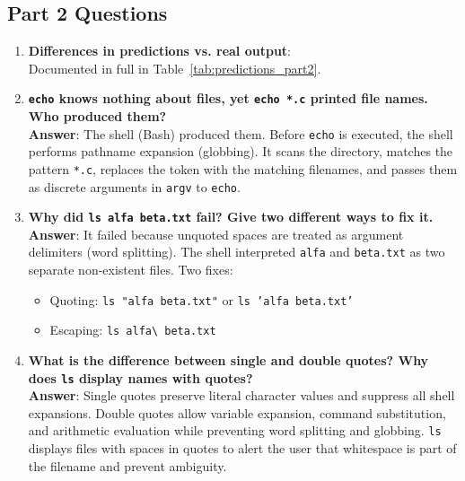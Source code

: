 \documentclass[12pt,a4paper]{article}
\begin{document}
\subsection{Part 2 Questions}
\begin{enumerate}
    \item \textbf{Differences in predictions vs. real output}: \\
    Documented in full in Table~\ref{tab:predictions_part2}.
    
    \item \textbf{\texttt{echo} knows nothing about files, yet \texttt{echo *.c} printed file names. Who produced them?} \\
    \textbf{Answer}: The shell (Bash) produced them. Before \texttt{echo} is executed, the shell performs pathname expansion (globbing). It scans the directory, matches the pattern \texttt{*.c}, replaces the token with the matching filenames, and passes them as discrete arguments in \texttt{argv} to \texttt{echo}.
    
    \item \textbf{Why did \texttt{ls alfa beta.txt} fail? Give two different ways to fix it.} \\
    \textbf{Answer}: It failed because unquoted spaces are treated as argument delimiters (word splitting). The shell interpreted \texttt{alfa} and \texttt{beta.txt} as two separate non-existent files. Two fixes:
    \begin{itemize}
        \item Quoting: \texttt{ls "alfa beta.txt"} or \texttt{ls 'alfa beta.txt'}
        \item Escaping: \texttt{ls alfa\textbackslash\ beta.txt}
    \end{itemize}
    
    \item \textbf{What is the difference between single and double quotes? Why does \texttt{ls} display names with quotes?} \\
    \textbf{Answer}: Single quotes preserve literal character values and suppress all shell expansions. Double quotes allow variable expansion, command substitution, and arithmetic evaluation while preventing word splitting and globbing. \texttt{ls} displays files with spaces in quotes to alert the user that whitespace is part of the filename and prevent ambiguity.
\end{enumerate}
\end{document}
